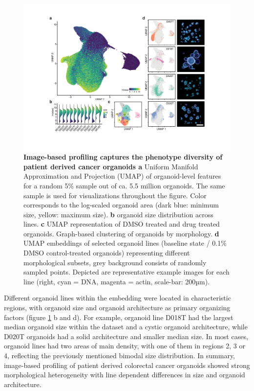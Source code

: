 \begin{flushleft}
\clearpage

\begin{figure}[h]
\centering
\includegraphics[width=\textwidth,
                height=\textheight,
                keepaspectratio]{figures/pdf/fig_140.pdf}
\caption{\textbf{Image-based profiling captures the phenotype diversity of patient derived cancer organoids a} Uniform Manifold Approximation and Projection (UMAP) of organoid-level features for a random 5\% sample out of ca. 5.5 million organoids. The same sample is used for visualizations throughout the figure. Color corresponds to the log-scaled organoid area (dark blue: minimum size, yellow: maximum size). \textbf{b} organoid size distribution across lines. \textbf{c} UMAP representation of DMSO treated and drug treated organoids. Graph-based clustering of organoids by morphology. \textbf{d} UMAP embeddings of selected organoid lines (baseline state / 0.1\% DMSO control-treated organoids) representing different morphological subsets, grey background consists of randomly sampled points. Depicted are representative example images for each line (right, cyan = DNA, magenta = actin, scale-bar: 200µm).}
\label{fig_140}
\end{figure}
\bigbreak

Different organoid lines within the embedding were located in characteristic regions, with organoid size and organoid architecture as primary organizing factors (figure \ref{fig_140} b and d). For example, organoid line D018T had the largest median organoid size within the dataset and a cystic organoid architecture, while D020T organoids had a solid architecture and smaller median size. In most cases, organoid lines had two areas of main density, with one of them in regions 2, 3 or 4, reflecting the previously mentioned bimodal size distribution. In summary, image-based profiling of patient derived colorectal cancer organoids showed strong morphological heterogeneity with line dependent differences in size and organoid architecture.


\end{flushleft}
